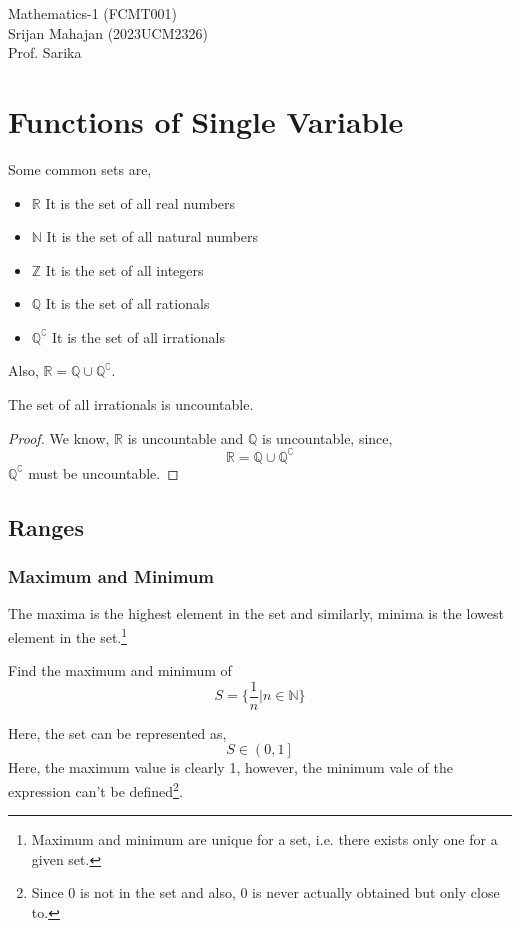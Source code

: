 



	\begin{titlepage}
		\begin{center}
			\Huge{Mathematics-1 (FCMT001)}\\
			Srijan Mahajan (2023UCM2326)\\
			Prof. Sarika
		\end{center}
	\end{titlepage}
	\tableofcontents
	\newpage

	\chapter{Functions of Single Variable}
	Some common sets are,
	\begin{itemize}
		\item $\mathbb{R}$ It is the set of all real numbers
		\item $\mathbb{N}$ It is the set of all natural numbers
		\item $\mathbb{Z}$ It is the set of all integers
		\item $\mathbb{Q}$ It is the set of all rationals
		\item $\mathbb{Q}^\complement$ It is the set of all irrationals
	\end{itemize}
	Also, $\mathbb{R}=\mathbb{Q} \cup \mathbb{Q}^\complement$.
	\begin{theorem}
		The set of all irrationals is uncountable.
	\end{theorem}
	\begin{proof}
		We know, $\mathbb{R}$ is uncountable and $\mathbb{Q}$ is uncountable, since,
		\[\mathbb{R}=\mathbb{Q} \cup \mathbb{Q}^\complement\]
		$\mathbb{Q}^\complement$ must be uncountable.
	\end{proof}
	\section{Ranges}
	\subsection{Maximum and Minimum}
	The maxima is the highest element in the set and similarly, minima is the lowest element in the set.\footnote{Maximum and minimum are unique for a set, i.e. there exists only one for a given set.}
	\begin{eg}
		Find the maximum and minimum of
		\[S=\{\frac{1}{n} | n \in \mathbb{N}\}\]
	\end{eg}
	\begin{explanation}
		Here, the set can be represented as,
		\[S\in \left( 0, 1 \right]\]
		Here, the maximum value is clearly 1, however, the minimum vale of the expression can't be defined\footnote{Since 0 is not in the set and also, 0 is never actually obtained but only close to.}.
	\end{explanation}
